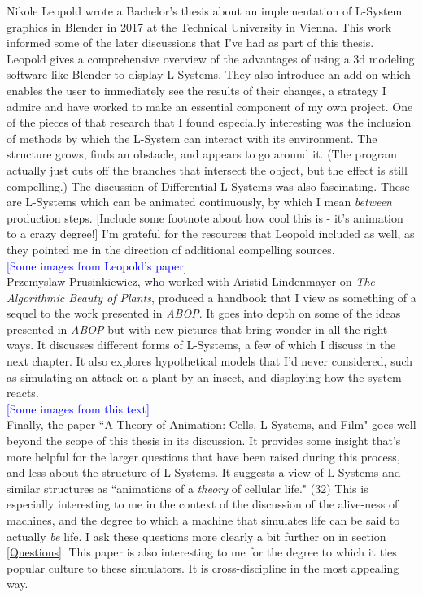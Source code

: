 \documentclass[12pt,twoside]{reedthesis}
\begin{document}
	Nikole Leopold wrote a Bachelor's thesis about an implementation of L-System graphics in Blender in 2017 at the Technical University in Vienna. This work informed some of the later discussions that I've had as part of this thesis. Leopold gives a comprehensive overview of the advantages of using a 3d modeling software like Blender to display L-Systems. They also introduce an add-on which enables the user to immediately see the results of their changes, a strategy I admire and have worked to make an essential component of my own project. One of the pieces of that research that I found especially interesting was the inclusion of methods by which the L-System can interact with its environment. The structure grows, finds an obstacle, and appears to go around it. (The program actually just cuts off the branches that intersect the object, but the effect is still compelling.) The discussion of Differential L-Systems was also fascinating. These are L-Systems which can be animated continuously, by which I mean \textit{between} production steps. [Include some footnote about how cool this is - it's animation to a crazy degree!] I'm grateful for the resources that Leopold included as well, as they pointed me in the direction of additional compelling sources.\\
	
	\textcolor{blue}{[Some images from Leopold's paper]}\\
	
	Przemyslaw Prusinkiewicz, who worked with Aristid Lindenmayer on \textit{The Algorithmic Beauty of Plants}, produced a handbook that I view as something of a sequel to the work presented in \textit{ABOP}. It goes into depth on some of the ideas presented in \textit{ABOP} but with new pictures that bring wonder in all the right ways. It discusses different forms of L-Systems, a few of which I discuss in the next chapter. It also explores hypothetical models that I'd never considered, such as simulating an attack on a plant by an insect, and displaying how the system reacts.\\
	
	\textcolor{blue}{[Some images from this text]}\\
	
	Finally, the paper ``A Theory of Animation: Cells, L-Systems, and Film" goes well beyond the scope of this thesis in its discussion. It provides some insight that's more helpful for the larger questions that have been raised during this process, and less about the structure of L-Systems. It suggests a view of L-Systems and similar structures as ``animations of a \textit{theory} of cellular life." (32) This is especially interesting to me in the context of the discussion of the alive-ness of machines, and the degree to which a machine that simulates life can be said to actually \textit{be} life. I ask these questions more clearly a bit further on in section \ref{Questions}. This paper is also interesting to me for the degree to which it ties popular culture to these simulators. It is cross-discipline in the most appealing way.\\
	
\end{document}
